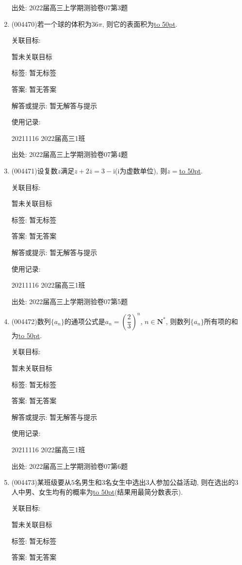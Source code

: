 \documentclass[10pt,a4paper]{article}
\newcommand{\blank}[1]{\underline{\hbox to #1pt{}}}
\begin{document}
\begin{enumerate}[1.]
出处: 2022届高三上学期测验卷07第3题
\item { (004470)}若一个球的体积为$36\pi$, 则它的表面积为\blank{50}.


关联目标:

暂未关联目标



标签: 暂无标签

答案: 暂无答案

解答或提示: 暂无解答与提示

使用记录:

20211116	2022届高三1班	


出处: 2022届高三上学期测验卷07第4题
\item { (004471)}设复数$z$满足$z+2\overline z=3-\mathrm{i}$($\mathrm{i}$为虚数单位), 则$z=$\blank{50}.


关联目标:

暂未关联目标



标签: 暂无标签

答案: 暂无答案

解答或提示: 暂无解答与提示

使用记录:

20211116	2022届高三1班	


出处: 2022届高三上学期测验卷07第5题
\item { (004472)}数列$\{a_n\}$的通项公式是$a_n=(\dfrac 23)^n$, $n\in \mathbf{N}^*$, 则数列$\{a_n\}$所有项的和为\blank{50}.


关联目标:

暂未关联目标



标签: 暂无标签

答案: 暂无答案

解答或提示: 暂无解答与提示

使用记录:

20211116	2022届高三1班	


出处: 2022届高三上学期测验卷07第6题
\item { (004473)}某班级要从$5$名男生和$3$名女生中选出$3$人参加公益活动, 则在选出的$3$人中男、女生均有的概率为\blank{50}(结果用最简分数表示).


关联目标:

暂未关联目标



标签: 暂无标签

答案: 暂无答案


\end{enumerate}
\end{document}
